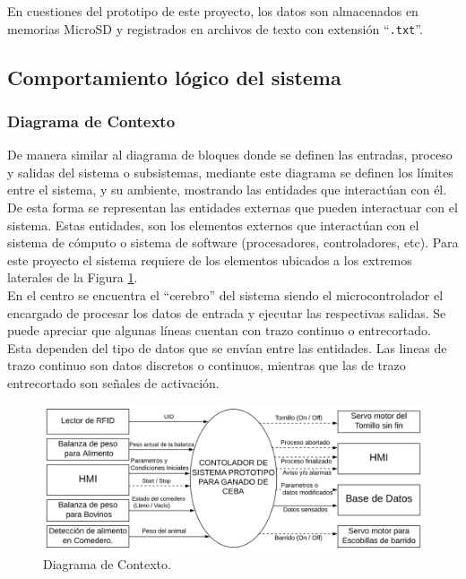 En cuestiones del prototipo de este proyecto, los datos son almacenados en memorias MicroSD y registrados en archivos de texto con extensión ``\texttt{.txt}''.

\pagebreak

\subsection{Comportamiento lógico del sistema}
\subsubsection{Diagrama de Contexto}

De manera similar al diagrama de bloques donde se definen las entradas, proceso y salidas del sistema o subsistemas, mediante este diagrama se definen los límites entre el sistema, y su ambiente, mostrando las entidades que interactúan con él. De esta forma se representan las entidades externas que pueden interactuar con el sistema. Estas entidades, son los elementos externos que interactúan con el sistema de cómputo o sistema de software (procesadores, controladores, etc).
Para este proyecto el sistema requiere de los elementos ubicados a los extremos laterales de la Figura \ref{contextopng}.\\
En el centro se encuentra el ``cerebro'' del sistema siendo el microcontrolador el encargado de procesar los datos de entrada y ejecutar las respectivas salidas. Se puede apreciar que algunas líneas cuentan con trazo continuo o entrecortado. Esta dependen del tipo de datos que se envían entre las entidades. Las lineas de trazo continuo son datos discretos o continuos, mientras que las de trazo entrecortado son señales de activación.


\begin{figure}[H]
    \begin{center}
    	\includegraphics[scale=0.60]{img/contexto.png}
    \end{center}
    \caption{Diagrama de Contexto.}
    \label{contextopng}
\end{figure}

